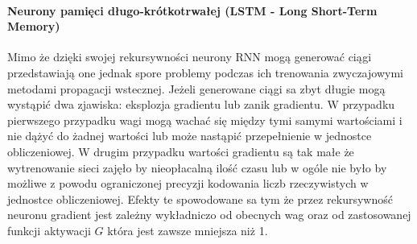 \paragraph{Neurony pamięci długo-krótkotrwałej (LSTM - Long Short-Term Memory)}
Mimo że dzięki swojej rekursywności neurony RNN mogą generować ciągi przedstawiają one jednak spore problemy podczas ich trenowania zwyczajowymi metodami propagacji wstecznej. Jeżeli generowane ciągi sa zbyt długie mogą wystąpić dwa zjawiska: eksplozja gradientu lub zanik gradientu. W przypadku pierwszego przypadku wagi mogą wachać się między tymi samymi wartościami i nie dążyć do żadnej wartości lub może nastąpić przepełnienie w jednostce obliczeniowej. W drugim przypadku wartości gradientu są tak małe że wytrenowanie sieci zajęło by nieopłacalną ilość czasu lub w ogóle nie było by możliwe z powodu ograniczonej precyzji kodowania liczb rzeczywistych w jednostce obliczeniowej. Efekty te spowodowane sa tym że przez rekursywność neuronu gradient jest zależny wykładniczo od obecnych wag oraz od zastosowanej funkcji aktywacji $G$ która jest zawsze mniejsza niż 1.\cite[p.~18]{LSTM-intro}

